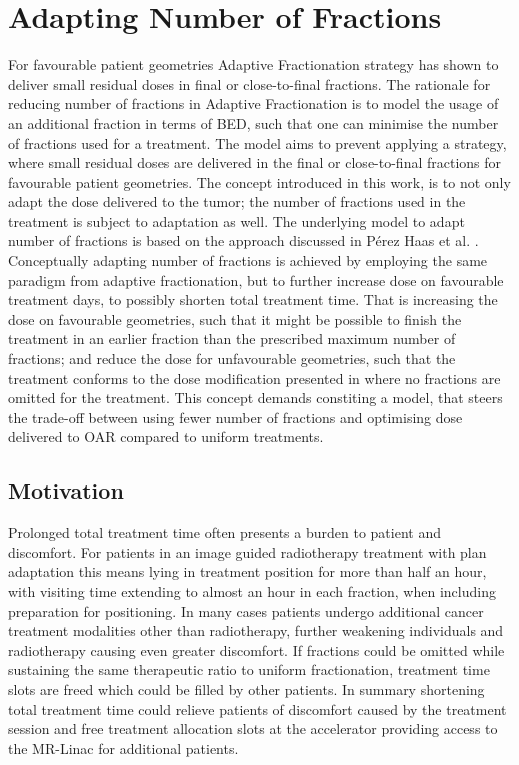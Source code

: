 \documentclass[\relativeRoot/ada.tex]{subfiles}
\begin{document}
\section{Adapting Number of Fractions}
For favourable patient geometries Adaptive Fractionation strategy has shown to deliver small residual doses in final or close-to-final fractions. The rationale for reducing number of fractions in Adaptive Fractionation is to model the usage of an additional fraction in terms of BED, such that one can minimise the number of fractions used for a treatment. The model aims to prevent applying a strategy, where small residual doses are delivered in the final or close-to-final fractions for favourable patient geometries. The concept introduced in this work, is to not only adapt the dose delivered to the tumor; the number of fractions used in the treatment is subject to adaptation as well. The underlying model to adapt number of fractions is based on the approach discussed in Pérez Haas et al. \cite{perezhaas_adaptive}. Conceptually adapting number of fractions is achieved by employing the same paradigm from adaptive fractionation, but to further increase dose on favourable treatment days, to possibly shorten total treatment time. That is increasing the dose on favourable geometries, such that it might be possible to finish the treatment in an earlier fraction than the prescribed maximum number of fractions; and reduce the dose for unfavourable geometries, such that the treatment conforms to the dose modification presented in \cite{perezhaas_adaptive} where no fractions are omitted for the treatment. This concept demands constiting a model, that steers the trade-off between using fewer number of fractions and optimising dose delivered to OAR compared to uniform treatments.

\subsection{Motivation}
Prolonged total treatment time often presents a burden to patient and discomfort. For patients in an image guided radiotherapy treatment with plan adaptation this means lying in treatment position for more than half an hour, with visiting time extending to almost an hour in each fraction, when including preparation for positioning. In many cases patients undergo additional cancer treatment modalities other than radiotherapy, further weakening individuals and radiotherapy causing even greater discomfort. If fractions could be omitted while sustaining the same therapeutic ratio to uniform fractionation, treatment time slots are freed which could be filled by other patients. In summary shortening total treatment time could relieve patients of discomfort caused by the treatment session and free treatment allocation slots at the accelerator providing access to the MR-Linac for additional patients.
\end{document}
